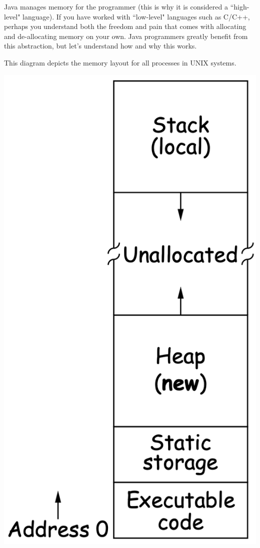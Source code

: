 \question Java manages memory for the programmer (this is why it is considered a ``high-level" language). If you have worked with ``low-level" languages such as C/C++, perhaps you understand both the freedom and pain that comes with allocating and de-allocating memory on your own. Java programmers greatly benefit from this abstraction, but let's understand how and why this works.


This diagram depicts the memory layout for all processes in UNIX systems.
\begin{center}
\includegraphics[scale=0.3]{unix-memory.png}
\end{center}
